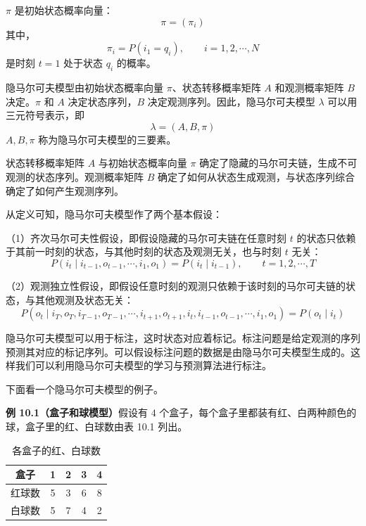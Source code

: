 \documentclass[UTF8,12pt,a4paper,fontset=fandol]{ctexart}
\begin{document}
$\pi$ 是初始状态概率向量：
\begin{equation}
  \pi=(\pi_i)
  \tag{10.5}
\end{equation}
其中，
\begin{equation}
  \pi_i=P(i_1=q_i),\qquad i=1,2,\cdots,N
  \tag{10.6}
\end{equation}
是时刻 $t=1$ 处于状态 $q_i$ 的概率。

隐马尔可夫模型由初始状态概率向量 $\pi$、状态转移概率矩阵 $A$ 和观测概率矩阵 $B$ 决定。$\pi$ 和 $A$ 决定状态序列，$B$ 决定观测序列。因此，隐马尔可夫模型 $\lambda$ 可以用三元符号表示，即
\begin{equation}
  \lambda=(A,B,\pi)
  \tag{10.7}
\end{equation}
$A,B,\pi$ 称为隐马尔可夫模型的三要素。

状态转移概率矩阵 $A$ 与初始状态概率向量 $\pi$ 确定了隐藏的马尔可夫链，生成不可观测的状态序列。观测概率矩阵 $B$ 确定了如何从状态生成观测，与状态序列综合确定了如何产生观测序列。

从定义可知，隐马尔可夫模型作了两个基本假设：

（1）齐次马尔可夫性假设，即假设隐藏的马尔可夫链在任意时刻 $t$ 的状态只依赖于其前一时刻的状态，与其他时刻的状态及观测无关，也与时刻 $t$ 无关：
\begin{equation}
  P(i_t\mid i_{t-1},o_{t-1},\cdots,i_1,o_1)=P(i_t\mid i_{t-1}),\qquad t=1,2,\cdots,T
  \tag{10.8}
\end{equation}

（2）观测独立性假设，即假设任意时刻的观测只依赖于该时刻的马尔可夫链的状态，与其他观测及状态无关：
\begin{equation}
  P(o_t\mid i_T,o_T,i_{T-1},o_{T-1},\cdots,i_{t+1},o_{t+1},i_t,i_{t-1},o_{t-1},\cdots,i_1,o_1)=P(o_t\mid i_t)
  \tag{10.9}
\end{equation}

隐马尔可夫模型可以用于标注，这时状态对应着标记。标注问题是给定观测的序列预测其对应的标记序列。可以假设标注问题的数据是由隐马尔可夫模型生成的。这样我们可以利用隐马尔可夫模型的学习与预测算法进行标注。

下面看一个隐马尔可夫模型的例子。

\noindent\textbf{例 10.1（盒子和球模型）}\quad 假设有 $4$ 个盒子，每个盒子里都装有红、白两种颜色的球，盒子里的红、白球数由表 10.1 列出。

\begin{table}[htbp]
  \centering
  \caption{各盒子的红、白球数}
  \begin{tabular}{c|cccc}
    \toprule
    盒子 & 1 & 2 & 3 & 4\\
    \midrule
    红球数 & 5 & 3 & 6 & 8\\
    白球数 & 5 & 7 & 4 & 2\\
    \bottomrule
  \end{tabular}
\end{table}
\end{document}
